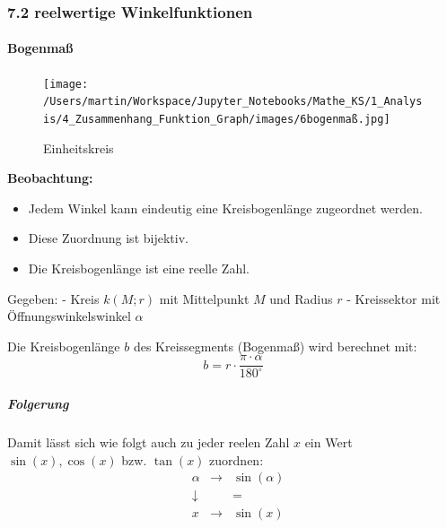 \documentclass[
  11pt,
  a4paper,
  DIV=11,
  numbers=noendperiod]{scrartcl}
\let\oldparagraph\paragraph
\renewcommand{\paragraph}[1]{\oldparagraph{#1}\mbox{}}
\let\oldsubparagraph\subparagraph
\renewcommand{\subparagraph}[1]{\oldsubparagraph{#1}\mbox{}}
\providecommand{\tightlist}{%
  \setlength{\itemsep}{0pt}\setlength{\parskip}{0pt}}\usepackage{longtable,booktabs,array}
\begin{document}
\subsubsection{7.2 reelwertige
Winkelfunktionen}\label{reelwertige-winkelfunktionen}

\paragraph{Bogenmaß}\label{bogenmauxdf}

\begin{figure}[H]

{\centering \texttt{[image: /Users/martin/Workspace/Jupyter\_Notebooks/Mathe\_KS/1\_Analysis/4\_Zusammenhang\_Funktion\_Graph/images/6bogenmaß.jpg]}

}

\caption{Einheitskreis}

\end{figure}%

\textbf{Beobachtung:}

\begin{itemize}
\tightlist
\item
  Jedem Winkel kann eindeutig eine Kreisbogenlänge zugeordnet werden.
\item
  Diese Zuordnung ist bijektiv.
\item
  Die Kreisbogenlänge ist eine reelle Zahl.
\end{itemize}

\begin{tcolorbox}[enhanced jigsaw, colbacktitle=quarto-callout-important-color!10!white, breakable, bottomtitle=1mm, toptitle=1mm, opacitybacktitle=0.6, opacityback=0, rightrule=.15mm, titlerule=0mm, leftrule=.75mm, colframe=quarto-callout-important-color-frame, toprule=.15mm, left=2mm, colback=white, title=\textcolor{quarto-callout-important-color}{\faExclamation}\hspace{0.5em}{Satz:}, coltitle=black, arc=.35mm, bottomrule=.15mm]

Gegeben: - Kreis \(k(M;r)\) mit Mittelpunkt \(M\) und Radius \(r\) -
Kreissektor mit Öffnungswinkelswinkel \(\alpha\)

Die Kreisbogenlänge \(b\) des Kreissegments (Bogenmaß) wird berechnet
mit: \[
 b= r \cdot \frac{\pi \cdot\alpha}{180^\circ}
\]

\end{tcolorbox}

\subparagraph{Folgerung}\label{folgerung}

Damit lässt sich wie folgt auch zu jeder reelen Zahl \(x\) ein Wert
\(\sin(x), \cos(x)\) bzw. \(\tan(x)\) zuordnen: \[
\begin{aligned}
&\alpha &\rightarrow & \sin(\alpha) \\
& \downarrow & &= \\
&x &\rightarrow &\sin(x)
\end{aligned}
\]
\end{document}
